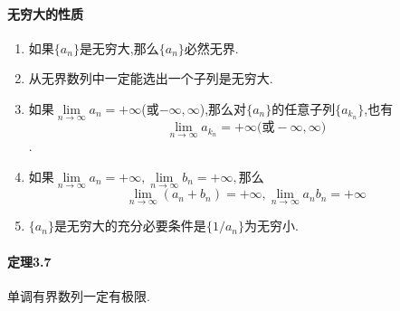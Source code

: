 \documentclass[UTF8]{ctexart}
\begin{document}
	\paragraph{无穷大的性质}
	\begin{enumerate}
		\item 如果$\{a_n\}$是无穷大,那么$\{a_n\}$必然无界.
		\item 从无界数列中一定能选出一个子列是无穷大.
		\item 如果$\lim\limits_{n\to\infty}a_n=+\infty$(或$-\infty,\infty$),那么对$\{a_n\}$的任意子列$\{a_{k_n}\}$,也有\[\lim\limits_{n\to\infty}a_{k_n}=+\infty\mbox{(或}-\infty,\infty)\].
		\item $\mbox{如果}\lim\limits_{n\to\infty}a_n=+\infty,\lim\limits_{n\to\infty}b_n=+\infty,\mbox{那么}$\[\lim\limits_{n\to\infty}(a_n+b_n)=+\infty,\lim\limits_{n\to\infty}a_nb_n=+\infty\]
		\item $\{a_n\}$是无穷大的充分必要条件是$\{1/a_n\}$为无穷小.
	\end{enumerate}
	\paragraph{定理3.7}单调有界数列一定有极限.
\end{document}
